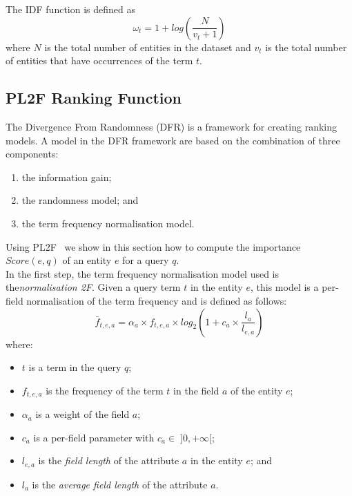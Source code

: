 The IDF function is defined as
$$
\omega_t=1+log\left(\frac{N}{v_t+1}\right)
$$
where $N$ is the total number of entities in the dataset and $v_t$ is the total number of entities that have occurrences of the term $t$.

\subsection{PL2F Ranking Function}

The Divergence From Randomness (DFR) is a framework for creating ranking models. A model in the DFR framework are based on the combination of three components:
\begin{enumerate}
	\item the information gain;
	\item the randomness model; and
	\item the term frequency normalisation model.
\end{enumerate}

Using PL2F~\cite{macdonald:2005:clef} we show in this section how to compute the importance $Score(e,q)$ of an entity $e$ for a query $q$.\\

In the first step, the term frequency normalisation model used is the\emph{normalisation 2F}. Given a query term $t$ in the entity $e$, this model is a per-field normalisation of the term frequency and is defined as follows:
\begin{equation}
	\bar{f}_{t,e,a} = \alpha_a\times f_{t,e,a} \times log_2\left(1+c_a\times\frac{l_a}{l_{e,a}}\right)
	\label{eq:pl2f}
\end{equation}
where:
\begin{itemize}
	\item $t$ is a term in the query $q$;
	\item $f_{t,e,a}$ is the frequency of the term $t$ in the field $a$ of the entity $e$;
	\item $\alpha_a$ is a weight of the field $a$;
	\item $c_a$ is a per-field parameter with $c_a \in\;]0,+\infty[$;
	\item $l_{e,a}$ is the \emph{field length} of the attribute $a$ in the entity $e$; and
	\item $l_a$ is the \emph{average field length} of the attribute $a$.\\
\end{itemize}

